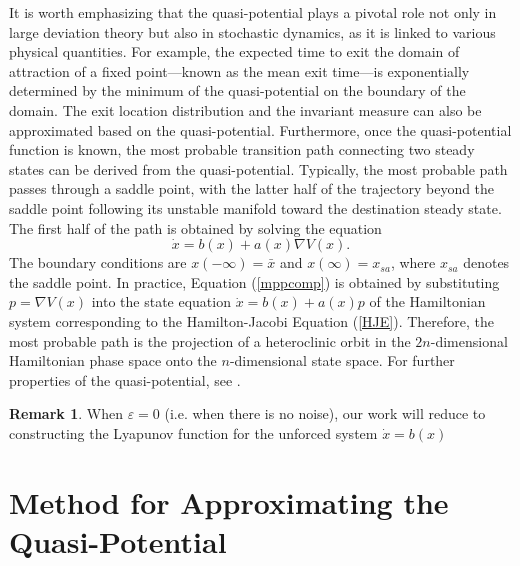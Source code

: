 \documentclass[11pt]{article}
\theoremstyle{plain}      %
\theoremstyle{definition} %
\newtheorem{remark}[theorem]{Remark}
\begin{document}
It is worth emphasizing that the quasi-potential plays a pivotal role not only in large deviation theory but also in stochastic dynamics, as it is linked to various physical quantities. For example, the expected time to exit the domain of attraction of a fixed point---known as the mean exit time---is exponentially determined by the minimum of the quasi-potential on the boundary of the domain. The exit location distribution and the invariant measure can also be approximated based on the quasi-potential. Furthermore, once the quasi-potential function is known, the most probable transition path connecting two steady states can be derived from the quasi-potential. Typically, the most probable path passes through a saddle point, with the latter half of the trajectory beyond the saddle point following its unstable manifold toward the destination steady state. The first half of the path is obtained by solving the equation \begin{equation}\label{mppcomp}
\dot{x} = b(x) + a(x) \nabla V(x).
\end{equation}
The boundary conditions are $x(-\infty)=\bar{x}$ and $x(\infty)=x_{sa}$, where $x_{sa}$ denotes the saddle point. In practice, Equation (\ref{mppcomp}) is obtained by substituting $p= \nabla V(x)$ into the state equation $\dot{x} = b(x) + a(x)p$ of the Hamiltonian system corresponding to the Hamilton-Jacobi Equation (\ref{HJE}). Therefore, the most probable path is the projection of a heteroclinic orbit in the $2n$-dimensional Hamiltonian phase space onto the $n$-dimensional state space. For further properties of the quasi-potential, see \cite{Freidlin2012}. \begin{remark}
When $\varepsilon = 0$ (i.e. when there is no noise), our work will reduce to constructing the Lyapunov function for the unforced system $\dot{x} = b(x)$ \cite{giesl2019approximation, lee2024note}
\end{remark}


\section{Method for Approximating the Quasi-Potential}\label{methsec}
\end{document}
